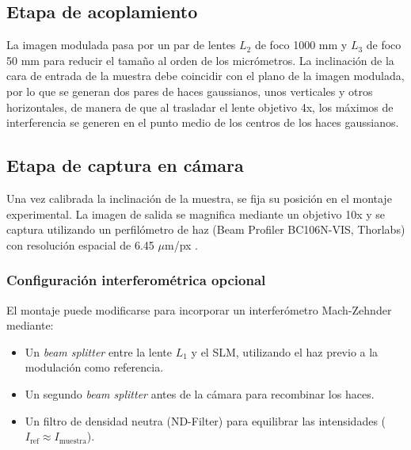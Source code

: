 \subsection{Etapa de acoplamiento}
La imagen modulada pasa por un par de lentes $L_2$ de foco 1000 mm y $L_3$ de foco 50 mm para reducir el tamaño al orden de los micrómetros. La inclinación de la cara de entrada de la muestra debe coincidir con el plano de la imagen modulada, por lo que se generan dos pares de haces gaussianos, unos verticales y otros horizontales, de manera de que al trasladar el lente objetivo 4x, los máximos de interferencia se generen en el punto medio de los centros de los haces gaussianos.

\subsection{Etapa de captura en cámara}
Una vez calibrada la inclinación de la muestra, se fija su posición en el montaje experimental. La imagen de salida se magnifica mediante un objetivo 10x y se captura utilizando un perfilómetro de haz (Beam Profiler BC106N-VIS, Thorlabs) con resolución espacial de 6.45 $\mu$m/px \citep{thorlabs_beam_profiler}.

\subsubsection{Configuración interferométrica opcional}
El montaje puede modificarse para incorporar un interferómetro Mach-Zehnder mediante:
\begin{itemize}
	\item Un \textit{beam splitter} entre la lente $L_1$ y el SLM, utilizando el haz previo a la modulación como referencia.
	\item Un segundo \textit{beam splitter} antes de la cámara para recombinar los haces.
	\item Un filtro de densidad neutra (ND-Filter) para equilibrar las intensidades ($I_{\text{ref}} \approx I_{\text{muestra}}$).
\end{itemize}

